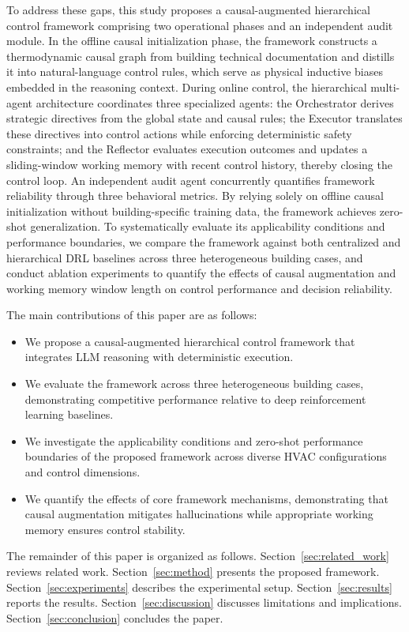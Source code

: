 \documentclass[a4paper]{cas-sc}
\begin{document}
To address these gaps, this study proposes a causal-augmented hierarchical control framework comprising two operational phases and an independent audit module. In the offline causal initialization phase, the framework constructs a thermodynamic causal graph from building technical documentation and distills it into natural-language control rules, which serve as physical inductive biases embedded in the reasoning context. During online control, the hierarchical multi-agent architecture coordinates three specialized agents: the Orchestrator derives strategic directives from the global state and causal rules; the Executor translates these directives into control actions while enforcing deterministic safety constraints; and the Reflector evaluates execution outcomes and updates a sliding-window working memory with recent control history, thereby closing the control loop. An independent audit agent concurrently quantifies framework reliability through three behavioral metrics. By relying solely on offline causal initialization without building-specific training data, the framework achieves zero-shot generalization. To systematically evaluate its applicability conditions and performance boundaries, we compare the framework against both centralized and hierarchical DRL baselines across three heterogeneous building cases, and conduct ablation experiments to quantify the effects of causal augmentation and working memory window length on control performance and decision reliability.

The main contributions of this paper are as follows:
\begin{itemize}
    \item We propose a causal-augmented hierarchical control framework that integrates LLM reasoning with deterministic execution.
    \item We evaluate the framework across three heterogeneous building cases, demonstrating competitive performance relative to deep reinforcement learning baselines.
    \item We investigate the applicability conditions and zero-shot performance boundaries of the proposed framework across diverse HVAC configurations and control dimensions.
    \item We quantify the effects of core framework mechanisms, demonstrating that causal augmentation mitigates hallucinations while appropriate working memory ensures control stability.
\end{itemize}

The remainder of this paper is organized as follows. Section~\ref{sec:related_work} reviews related work. Section~\ref{sec:method} presents the proposed framework. Section~\ref{sec:experiments} describes the experimental setup. Section~\ref{sec:results} reports the results. Section~\ref{sec:discussion} discusses limitations and implications. Section~\ref{sec:conclusion} concludes the paper.
\end{document}

